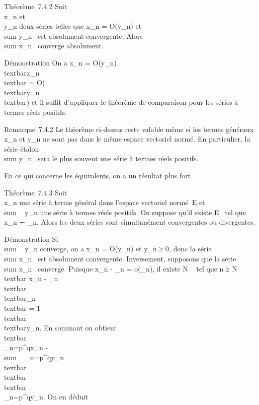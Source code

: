 \documentclass[]{article}
\begin{document}
Théorème~7.4.2 Soit \\\sum
 x\_n et \\\sum
 y\_n deux séries telles que x\_n = O(y\_n)
et \\sum  y\_n~
est absolument convergente. Alors
\\sum  x\_n~
converge absolument.

Démonstration On a x\_n = O(y\_n)
\Leftrightarrow
\\textbar{}x\_n\\textbar{} =
O(\\textbar{}y\_n\\textbar{}) et
il suffit d'appliquer le théorème de comparaison pour les séries à
termes réels positifs.

Remarque~7.4.2 Le théorème ci-dessus reste valable même si les termes
généraux x\_n et y\_n ne sont pas dans le même espace
vectoriel normé. En particulier, la série étalon
\\sum  y\_n~ sera
le plus souvent une série à termes réels positifs.

En ce qui concerne les équivalents, on a un résultat plus fort

Théorème~7.4.3 Soit \\\sum
 x\_n une série à terme général dans l'espace vectoriel
normé~E et \\sum ~
y\_n une série à termes réels positifs. On suppose qu'il existe
\ell \in E \diagdown\0\ tel que x\_n ∼
\elly\_n. Alors les deux séries sont simultanément convergentes ou
divergentes.

Démonstration Si \\sum ~
y\_n converge, on a x\_n = O(y\_n) et
y\_n ≥ 0, donc la série
\\sum  x\_n~ est
absolument convergente. Inversement, supposons que la série
\\sum  x\_n~
converge. Puisque x\_n - \elly\_n = o(\elly\_n), il
existe N \in {}~ tel que n ≥ N \rigtharrow~\\textbar{} x\_n -
\elly\_n\\textbar{}  
\\textbar{}\elly\_n\\textbar{} = 1
\\textbar{}\ell\\textbar{}y\_n. En
sommant on obtient
\\textbar{}\\\sum
 \_n=p^qx\_n -
\ell\\sum ~
\_n=p^qy\_n\\textbar{} 
\\textbar{}\ell\\textbar{}\\\sum
 \_n=p^qy\_n. On en déduit
\end{document}
